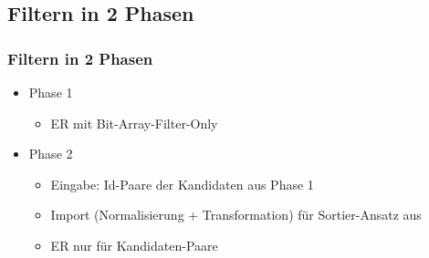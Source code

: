 \subsection{Filtern in 2 Phasen}

\begin{frame}
	\frametitle{Filtern in 2 Phasen}
	\begin{itemize}
		\setlength\itemsep{\stdItemSep}
		\item Phase 1
		\begin{itemize}
			\setlength\itemsep{\stdItemSep}
			\vspace*{\stdItemSep}
			\item ER mit Bit-Array-Filter-Only
		\end{itemize}
		\item Phase 2
		\begin{itemize}
			\setlength\itemsep{\stdItemSep}
			\vspace*{\stdItemSep}
			\item Eingabe: Id-Paare der Kandidaten aus Phase 1
			\item Import (Normalisierung + Transformation) für Sortier-Ansatz aus
			\item ER nur für Kandidaten-Paare
		\end{itemize}
	\end{itemize}
\end{frame}

